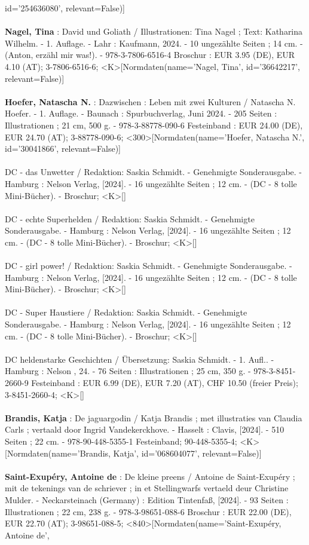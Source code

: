 \documentclass{article}
\begin{document}
\begin{multicols}{3}
id='254636080', relevant=False)]\\\\\textbf{Nagel, Tina} : David und Goliath / Illustrationen: Tina Nagel ; Text: Katharina Wilhelm. - 1. Auflage. - Lahr : Kaufmann, 2024. - 10 ungezählte Seiten ; 14 cm. - (Anton, erzähl mir was!). - 978-3-7806-6516-4 Broschur : EUR 3.95 (DE), EUR 4.10 (AT); 3-7806-6516-6; <K>[Normdaten(name='Nagel, Tina', id='36642217', relevant=False)]\\\\\textbf{Hoefer, Natascha N.} : Dazwischen : Leben mit zwei Kulturen / Natascha N. Hoefer. - 1. Auflage. - Baunach : Spurbuchverlag, Juni 2024. - 205 Seiten : Illustrationen ; 21 cm, 500 g. - 978-3-88778-090-6 Festeinband : EUR 24.00 (DE), EUR 24.70 (AT); 3-88778-090-6; <300>[Normdaten(name='Hoefer, Natascha N.', id='30041866', relevant=False)]\\\\DC - das Unwetter / Redaktion: Saskia Schmidt. - Genehmigte Sonderausgabe. - Hamburg : Nelson Verlag, [2024]. - 16 ungezählte Seiten ; 12 cm. - (DC - 8 tolle Mini-Bücher). - Broschur; <K>[]\\\\DC - echte Superhelden / Redaktion: Saskia Schmidt. - Genehmigte Sonderausgabe. - Hamburg : Nelson Verlag, [2024]. - 16 ungezählte Seiten ; 12 cm. - (DC - 8 tolle Mini-Bücher). - Broschur; <K>[]\\\\DC - girl power! / Redaktion: Saskia Schmidt. - Genehmigte Sonderausgabe. - Hamburg : Nelson Verlag, [2024]. - 16 ungezählte Seiten ; 12 cm. - (DC - 8 tolle Mini-Bücher). - Broschur; <K>[]\\\\DC - Super Haustiere / Redaktion: Saskia Schmidt. - Genehmigte Sonderausgabe. - Hamburg : Nelson Verlag, [2024]. - 16 ungezählte Seiten ; 12 cm. - (DC - 8 tolle Mini-Bücher). - Broschur; <K>[]\\\\DC  heldenstarke Geschichten / Übersetzung: Saskia Schmidt. - 1. Aufl.. - Hamburg : Nelson   , 24. - 76 Seiten : Illustrationen ; 25 cm, 350 g. - 978-3-8451-2660-9 Festeinband : EUR 6.99 (DE), EUR 7.20 (AT), CHF 10.50 (freier Preis); 3-8451-2660-4; <K>[]\\\\\textbf{Brandis, Katja} : De jaguargodin / Katja Brandis ; met illustraties van Claudia Carls ; vertaald door Ingrid Vandekerckhove. - Hasselt : Clavis, [2024]. - 510 Seiten ; 22 cm. - 978-90-448-5355-1 Festeinband; 90-448-5355-4; <K>[Normdaten(name='Brandis, Katja', id='068604077', relevant=False)]\\\\\textbf{Saint-Exupéry, Antoine de} : De kleine preens / Antoine de Saint-Exupéry ; mit de tekenings van de schriever ; in et Stellingwarfs vertaeld deur Christine Mulder. - Neckarsteinach (Germany) : Edition Tintenfaß, [2024]. - 93 Seiten : Illustrationen ; 22 cm, 238 g. - 978-3-98651-088-6 Broschur : EUR 22.00 (DE), EUR 22.70 (AT); 3-98651-088-5; <840>[Normdaten(name='Saint-Exupéry, Antoine de', 
\end{multicols}
\end{document}
